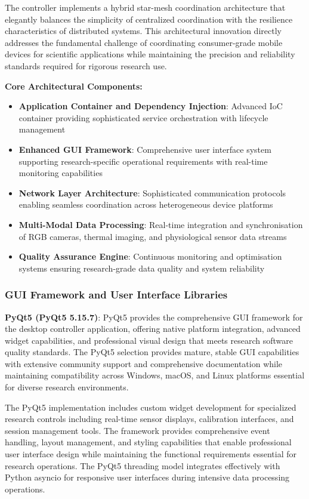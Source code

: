 \documentclass[11pt,a4paper]{report}
\begin{document}
The controller implements a hybrid star-mesh coordination architecture that elegantly balances the simplicity of centralized coordination with the resilience characteristics of distributed systems. This architectural innovation directly addresses the fundamental challenge of coordinating consumer-grade mobile devices for scientific applications while maintaining the precision and reliability standards required for rigorous research use.

\noindent \textbf{Core Architectural Components:}
\begin{itemize}
\item \textbf{Application Container and Dependency Injection}: Advanced IoC container providing sophisticated service orchestration with lifecycle management
\item \textbf{Enhanced GUI Framework}: Comprehensive user interface system supporting research-specific operational requirements with real-time monitoring capabilities
\item \textbf{Network Layer Architecture}: Sophisticated communication protocols enabling seamless coordination across heterogeneous device platforms
\item \textbf{Multi-Modal Data Processing}: Real-time integration and synchronisation of RGB cameras, thermal imaging, and physiological sensor data streams
\item \textbf{Quality Assurance Engine}: Continuous monitoring and optimisation systems ensuring research-grade data quality and system reliability
\end{itemize}

\subsubsection{GUI Framework and User Interface Libraries}

\noindent \textbf{PyQt5 (PyQt5 5.15.7)}: PyQt5 provides the comprehensive GUI framework for the desktop controller application, offering native platform integration, advanced widget capabilities, and professional visual design that meets research software quality standards. The PyQt5 selection provides mature, stable GUI capabilities with extensive community support and comprehensive documentation while maintaining compatibility across Windows, macOS, and Linux platforms essential for diverse research environments.

The PyQt5 implementation includes custom widget development for specialized research controls including real-time sensor displays, calibration interfaces, and session management tools. The framework provides comprehensive event handling, layout management, and styling capabilities that enable professional user interface design while maintaining the functional requirements essential for research operations. The PyQt5 threading model integrates effectively with Python asyncio for responsive user interfaces during intensive data processing operations.
\end{document}
